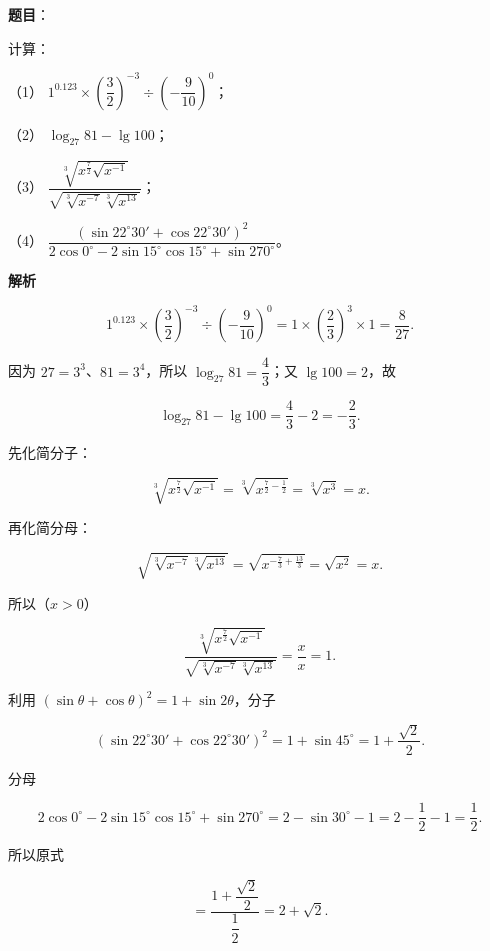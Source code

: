\begin{answer}

\textbf{题目}：

计算：

（1） $1^{0.123}\times\left(\dfrac32\right)^{-3}\div\left(-\dfrac9{10}\right)^0$；

（2） $\log_{27}81-\lg100$；

（3） $\dfrac{\sqrt[3]{x^{\frac72}\sqrt{x^{-1}}}}{\sqrt{\sqrt[3]{x^{-7}}\sqrt[3]{x^{13}}}}$；

（4） $\dfrac{\left(\sin22^\circ30'+\cos22^\circ30'\right)^2}{2\cos0^\circ-2\sin15^\circ\cos15^\circ+\sin270^\circ}$。

\textbf{解析}


\nopagebreak[4]
\[
1^{0.123}\times\left(\frac32\right)^{-3}\div\left(-\frac9{10}\right)^0
=1\times\left(\frac23\right)^3\times1
=\frac{8}{27}.
\]


因为 $27=3^3$、$81=3^4$，所以 $\log_{27}81=\dfrac43$；又 $\lg100=2$，故

\nopagebreak[4]
\[
\log_{27}81-\lg100=\frac43-2=-\frac23.
\]


先化简分子：

\nopagebreak[4]
\[
\sqrt[3]{x^{\frac72}\sqrt{x^{-1}}}
=\sqrt[3]{x^{\frac72-\frac12}}
=\sqrt[3]{x^{3}}=x.
\]

再化简分母：

\nopagebreak[4]
\[
\sqrt{\sqrt[3]{x^{-7}}\sqrt[3]{x^{13}}}
=\sqrt{x^{-\frac73+\frac{13}3}}
=\sqrt{x^{2}}
=x.
\]

所以（$x>0$）

\nopagebreak[4]
\[
\frac{\sqrt[3]{x^{\frac72}\sqrt{x^{-1}}}}{\sqrt{\sqrt[3]{x^{-7}}\sqrt[3]{x^{13}}}}
=\frac{x}{x}
=1.
\]


利用 $(\sin\theta+\cos\theta)^2=1+\sin2\theta$，分子

\nopagebreak[4]
\[
(\sin22^\circ30'+\cos22^\circ30')^2=1+\sin45^\circ=1+\frac{\sqrt2}2.
\]

分母

\nopagebreak[4]
\[
2\cos0^\circ-2\sin15^\circ\cos15^\circ+\sin270^\circ
=2-\sin30^\circ-1
=2-\frac12-1=\frac12.
\]

所以原式

\nopagebreak[4]
\[
=\frac{1+\dfrac{\sqrt2}2}{\dfrac12}=2+\sqrt2.
\]





\end{answer}
